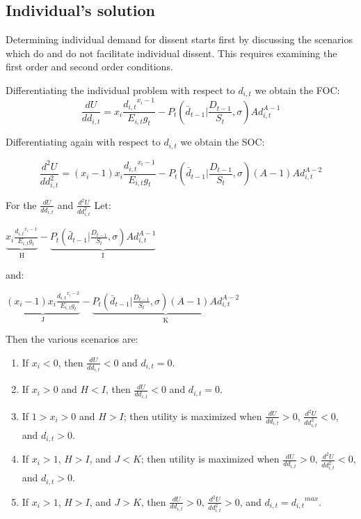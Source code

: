 \documentclass[12pt]{article}
\begin{document}
\begin{spacing}{1.5}
 
\subsection{Individual's solution}


Determining individual demand for dissent starts first by discussing the scenarios which do and do not facilitate individual dissent. This requires examining the first order and second order conditions. 
 
\vspace{.5 em}
\noindent Differentiating the individual problem with respect to $d_{i,t}$ we obtain the FOC: 
\begin{equation}
\frac{dU}{dd_{i,t}} = x_i \frac{{d_{i,t}}^{x_i -1}}{E_{i,t} g_t} - P_t \left(\bar{d}_{t-1} \Big|\frac{D_{t-1}}{S_t},\sigma \right)Ad_{i,t}^{A-1}  
\end{equation}

\noindent Differentiating again with respect to $d_{i,t}$ we obtain the SOC: 

\begin{equation}
\frac{d^2U}{dd_{i,t}^2}=(x_i -1) x_i \frac{{d_{i,t}}^{x_i -1}}{E_{i,t} g_t} - P_t \left(\bar{d}_{t-1} \Big|\frac{D_{t-1}}{S_t},\sigma \right)(A-1)Ad_{i,t}^{A-2}  
\end{equation}

\noindent For the $\frac{dU}{dd_{i,t}}$ and $\frac{d^2U}{dd_{i,t}^2}$ Let:    
\begin{center}
$\underbrace{ x_i \frac{{d_{i,t}}^{x_i -1}}{E_{i,t} g_t}}_\textrm{H} - \underbrace{P_t \left(\bar{d}_{t-1} \Big|\frac{D_{t-1}}{S_t},\sigma \right)Ad_{i,t}^{A-1}}_\textrm{I}$  	
\end{center}

\noindent and: 

\begin{center}
$\underbrace{(x_i -1) x_i \frac{{d_{i,t}}^{x_i -2}}{E_{i,t} g_t}}_\textrm{J} -\underbrace{P_t \left(\bar{d}_{t-1}\Big|\frac{D_{t-1}}{S_t},\sigma \right)(A-1)Ad_{i,t}^{A-2}}_\textrm{K}$  
\end{center}

\noindent Then the various scenarios are: 
\begin{enumerate}
\item If $x_i<0$, then $\frac{dU}{dd_{i,t}} < 0$ and $d_{i,t}=0$. 
\item If $x_i>0$ and $H<I$, then $\frac{dU}{dd_{i,t}} < 0$ and $d_{i,t}=0$. 
\item If $1>x_i>0$ and $H>I$; then utility is maximized when $\frac{dU}{dd_{i,t}} > 0$, $\frac{d^2U}{dd_{i,t}^2}<0$, and $d_{i,t}>0$.  
\item If $x_i>1$, $H>I$, and $J<K$; then utility is maximized when $\frac{dU}{dd_{i,t}} > 0$, $\frac{d^2U}{dd_{i,t}^2}<0$, and $d_{i,t}>0$. 
\item If $x_i>1$, $H>I$, and $J>K$, then $\frac{dU}{dd_{i,t}} > 0$, $\frac{d^2U}{dd_{i,t}^2}>0$, and $d_{i,t}={d_{i,t}}^{max} $. 
\end{enumerate}


\end{spacing}
\end{document}
